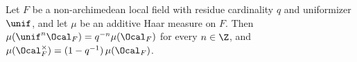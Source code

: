 Let $F$ be a non-archimedean local field with residue cardinality $q$ and uniformizer $\unif$, and let $\mu$ be an
additive Haar measure on $F$. Then $\mu(\unif^n\Ocal_F)=q^{-n}\mu(\Ocal_F)$ for every $n\in\Z$, and
$\mu(\Ocal_F^\times)=(1-q^{-1})\,\mu(\Ocal_F)$.

